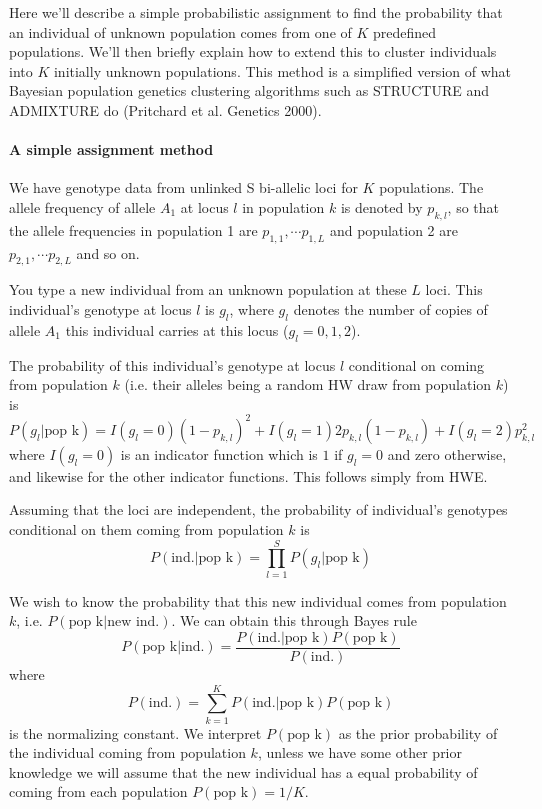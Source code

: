 Here we'll describe a simple probabilistic assignment to find the
probability that an individual of unknown population comes from one of
$K$ predefined populations. We'll then briefly explain how to extend this
to cluster individuals into $K$ initially unknown populations. This
method is a simplified version of what Bayesian population genetics
clustering algorithms such as STRUCTURE and ADMIXTURE do (Pritchard et al. Genetics 2000). 

\paragraph{A simple assignment method}

We have genotype data from unlinked S bi-allelic loci for $K$ populations. The allele frequency of allele $A_1$ at locus $l$ in population $k$ is denoted by $p_{k,l}$, so that the allele frequencies in population 1 are $p_{1,1},\cdots p_{1,L}$ and population 2 are $p_{2,1},\cdots p_{2,L}$ and so on. 

You type a new individual from an unknown population at these $L$ loci. This individual's genotype at locus $l$ is $g_l$, where $g_l$ denotes the number of copies of allele $A_1$ this individual carries at this locus ($g_l=0,1,2$). 

The probability of this individual's genotype at locus $l$ conditional on coming from population $k$ (i.e. their alleles being a random HW draw from population $k$) is 
\begin{equation}
P(g_l | \textrm{pop k}) = I(g_l=0) (1-p_{k,l})^2 +  I(g_l=1) 2 p_{k,l} (1-p_{k,l}) + I(g_l=2) p_{k,l}^2
\end{equation}
where $I(g_l=0)$ is an indicator function which is $1$ if $g_l=0$ and
zero otherwise, and likewise for the other indicator functions. This
follows simply from HWE.

Assuming that the loci are independent, the probability of individual's genotypes conditional on them coming from population $k$ is 
\begin{equation}
P(\textrm{ind.} | \textrm{pop k})  = \prod_{l=1}^S P(g_l | \textrm{pop k}) \label{eqn_assignment}
\end{equation}


We wish to know the probability that this new individual comes from population $k$, i.e. $P(\textrm{pop k} | \textrm{new ind.})$. We can obtain this through Bayes rule 
\begin{equation}
 P(\textrm{pop k} | \textrm{ind.})  = \frac{P(\textrm{ind.} | \textrm{pop k}) P(\textrm{pop k})}{P(\textrm{ind.})}
\end{equation}
where 
\begin{equation}
P(\textrm{ind.}) = \sum_{k=1}^K  P(\textrm{ind.} | \textrm{pop k}) P(\textrm{pop k})
\end{equation}
is the normalizing constant. We interpret $P(\textrm{pop k})$ as the
prior probability of the individual coming from population $k$, unless
we have some other prior knowledge we will assume that the new individual has a equal probability of coming from each population $P(\textrm{pop k})=1/K$.  

